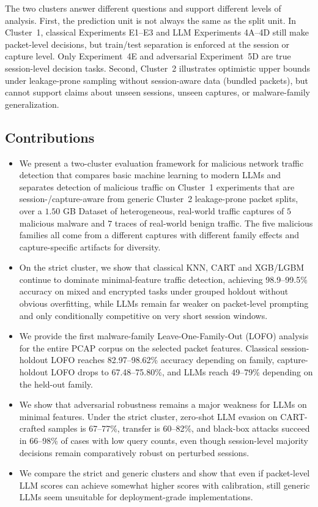 \documentclass[conference]{IEEEtran}
\begin{document}
The two clusters answer different questions and support different levels of analysis. First, the prediction unit is not always the same as the split unit. In Cluster~1, classical Experiments E1--E3 and LLM Experiments 4A--4D still make packet-level decisions, but train/test separation is enforced at the session or capture level. Only Experiment~4E and adversarial Experiment~5D are true session-level decision tasks. Second, Cluster~2 illustrates optimistic upper bounds under leakage-prone sampling without session-aware data (bundled packets), but cannot support claims about unseen sessions, unseen captures, or malware-family generalization.

\subsection{Contributions}
\begin{itemize}
\item We present a two-cluster evaluation framework for malicious network traffic detection that compares basic machine learning to modern LLMs and separates detection of malicious traffic on Cluster~1 experiments that are session-/capture-aware from generic Cluster~2 leakage-prone packet splits, over a $1.50$ GB Dataset of heterogeneous, real-world traffic captures of $5$ malicious malware and $7$ traces of real-world benign traffic. The five malicious families all come from a different captures with different family effects and capture-specific artifacts for diversity.

\item On the strict cluster, we show that classical KNN, CART and XGB/LGBM continue to dominate minimal-feature traffic detection, achieving 98.9--99.5\% accuracy on mixed and encrypted tasks under grouped holdout without obvious overfitting, while LLMs remain far weaker on packet-level prompting and only conditionally competitive on very short session windows.

\item We provide the first malware-family Leave-One-Family-Out (LOFO) analysis for the entire PCAP corpus on the selected packet features. Classical session-holdout LOFO reaches 82.97--98.62\% accuracy depending on family, capture-holdout LOFO drops to 67.48--75.80\%, and LLMs reach 49--79\% depending on the held-out family.

\item We show that adversarial robustness remains a major weakness for LLMs on minimal features. Under the strict cluster, zero-shot LLM evasion on CART-crafted samples is 67--77\%, transfer is 60--82\%, and black-box attacks succeed in 66--98\% of cases with low query counts, even though session-level majority decisions remain comparatively robust on perturbed sessions.

\item We compare the strict and generic clusters and show that even if packet-level LLM scores can achieve somewhat higher scores with calibration, still generic LLMs seem unsuitable for deployment-grade implementations.
\end{itemize}
\end{document}
